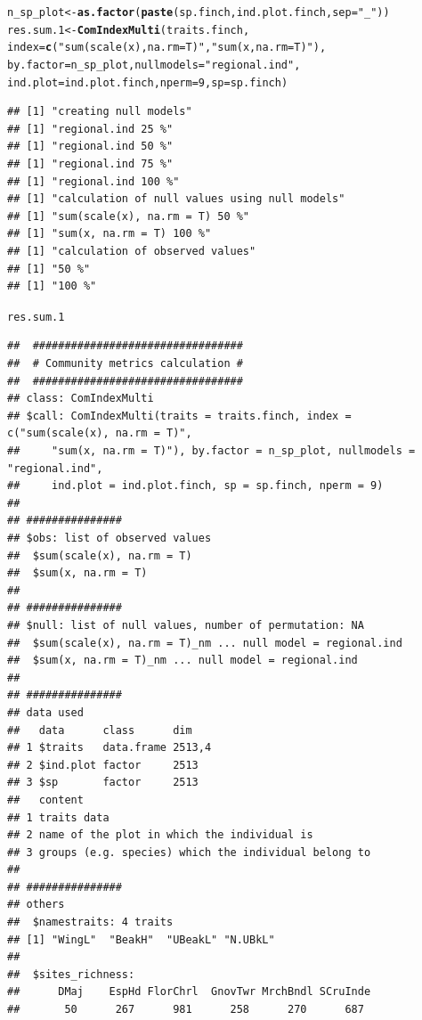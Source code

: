 \documentclass[12pt]{article}\usepackage[]{graphicx}\usepackage[]{color}
\makeatletter
\newcommand{\hlnum}[1]{\textcolor[rgb]{0.686,0.059,0.569}{#1}}%
\newcommand{\hlstr}[1]{\textcolor[rgb]{0.192,0.494,0.8}{#1}}%
\newcommand{\hlstd}[1]{\textcolor[rgb]{0.345,0.345,0.345}{#1}}%
\newcommand{\hlkwb}[1]{\textcolor[rgb]{0.69,0.353,0.396}{#1}}%
\newcommand{\hlkwc}[1]{\textcolor[rgb]{0.333,0.667,0.333}{#1}}%
\newcommand{\hlkwd}[1]{\textcolor[rgb]{0.737,0.353,0.396}{\textbf{#1}}}%
\newenvironment{kframe}{%
 \def\at@end@of@kframe{}%
 \ifinner\ifhmode%
  \def\at@end@of@kframe{\end{minipage}}%
  \begin{minipage}{\columnwidth}%
 \fi\fi%
 \def\FrameCommand##1{\hskip\@totalleftmargin \hskip-\fboxsep
 \colorbox{shadecolor}{##1}\hskip-\fboxsep
     \hskip-\linewidth \hskip-\@totalleftmargin \hskip\columnwidth}%
 \MakeFramed {\advance\hsize-\width
   \@totalleftmargin\z@ \linewidth\hsize
   \@setminipage}}%
 {\par\unskip\endMakeFramed%
 \at@end@of@kframe}
\newenvironment{knitrout}{}{} %
\makeatother
\begin{document}
\begin{knitrout}
\color{fgcolor}\begin{kframe}
\begin{alltt}
\hlstd{n_sp_plot}\hlkwb{<-}\hlkwd{as.factor}\hlstd{(}\hlkwd{paste}\hlstd{(sp.finch, ind.plot.finch,} \hlkwc{sep} \hlstd{=} \hlstr{"_"}\hlstd{))}
\hlstd{res.sum.1}\hlkwb{<-}\hlkwd{ComIndexMulti}\hlstd{(traits.finch,}
              \hlkwc{index} \hlstd{=} \hlkwd{c}\hlstd{(}\hlstr{"sum(scale(x), na.rm = T)"}\hlstd{,} \hlstr{"sum(x, na.rm = T)"}\hlstd{),}
              \hlkwc{by.factor} \hlstd{= n_sp_plot,} \hlkwc{nullmodels} \hlstd{=} \hlstr{"regional.ind"}\hlstd{,}
              \hlkwc{ind.plot} \hlstd{= ind.plot.finch,} \hlkwc{nperm} \hlstd{=} \hlnum{9}\hlstd{,} \hlkwc{sp} \hlstd{= sp.finch)}
\end{alltt}
\begin{verbatim}
## [1] "creating null models"
## [1] "regional.ind 25 %"
## [1] "regional.ind 50 %"
## [1] "regional.ind 75 %"
## [1] "regional.ind 100 %"
## [1] "calculation of null values using null models"
## [1] "sum(scale(x), na.rm = T) 50 %"
## [1] "sum(x, na.rm = T) 100 %"
## [1] "calculation of observed values"
## [1] "50 %"
## [1] "100 %"
\end{verbatim}
\begin{alltt}
\hlstd{res.sum.1}
\end{alltt}
\begin{verbatim}
## 	#################################
## 	# Community metrics calculation #
## 	#################################
## class: ComIndexMulti
## $call: ComIndexMulti(traits = traits.finch, index = c("sum(scale(x), na.rm = T)", 
##     "sum(x, na.rm = T)"), by.factor = n_sp_plot, nullmodels = "regional.ind", 
##     ind.plot = ind.plot.finch, sp = sp.finch, nperm = 9)
## 
## ###############
## $obs: list of observed values
## 	$sum(scale(x), na.rm = T)
## 	$sum(x, na.rm = T)
## 
## ###############
## $null: list of null values, number of permutation: NA 
## 	$sum(scale(x), na.rm = T)_nm ... null model = regional.ind
## 	$sum(x, na.rm = T)_nm ... null model = regional.ind
## 
## ###############
## data used
##   data      class      dim   
## 1 $traits   data.frame 2513,4
## 2 $ind.plot factor     2513  
## 3 $sp       factor     2513  
##   content                                             
## 1 traits data                                         
## 2 name of the plot in which the individual is         
## 3 groups (e.g. species) which the individual belong to
## 
## ###############
## others
## 	$namestraits: 4 traits
## [1] "WingL"  "BeakH"  "UBeakL" "N.UBkL"
## 
## 	$sites_richness:
## 	    DMaj    EspHd FlorChrl  GnovTwr MrchBndl SCruInde 
##       50      267      981      258      270      687
\end{verbatim}
\end{kframe}
\end{knitrout}
\end{document}
